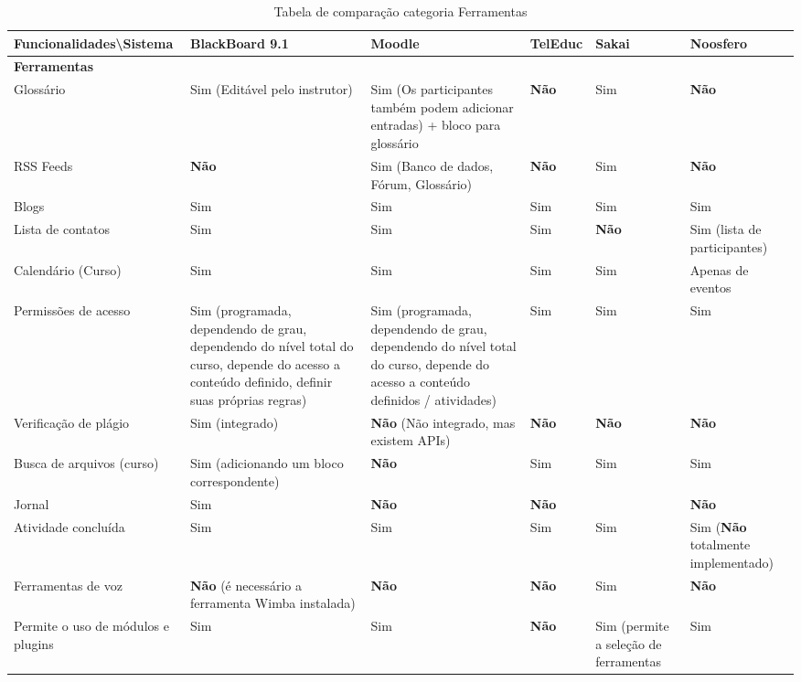 \begin{landscape}
\begin{table}[H]
\begin{tabular}{|@{}p{5.5cm}|p{3.5cm}|p{3.5cm}|p{3.5cm}|p{3.5cm}|p{3.5cm}@{}|}
\hline
\textbf{Funcionalidades\textbackslash Sistema} & \textbf{BlackBoard 9.1} & \textbf{Moodle} & \textbf{TelEduc} & \textbf{Sakai} & \textbf{Noosfero}\\ \hline
\textbf{Ferramentas} &  &  &  &  &  \\
Glossário & Sim {\tiny (Editável pelo instrutor)} & Sim {\tiny (Os participantes também podem adicionar entradas) + bloco para glossário} & \textbf{Não}  & Sim & \textbf{Não} \\
RSS Feeds & \textbf{Não}  & Sim {\tiny (Banco de dados, Fórum, Glossário)} & \textbf{Não}  & Sim & \textbf{Não}  \\
Blogs & Sim & Sim & Sim & Sim & Sim \\
Lista de contatos & Sim & Sim & Sim & \textbf{Não}  & Sim {\tiny (lista de participantes)}\\
Calendário (Curso) & Sim & Sim & Sim & Sim & {\tiny Apenas de eventos} \\
Permissões de acesso & Sim {\tiny (programada, dependendo de grau, dependendo do nível total do curso, depende do acesso a conteúdo definido, definir suas próprias regras)} & Sim \tiny{(programada, dependendo de grau, dependendo do nível total do curso, depende do acesso a conteúdo definidos / atividades)} & Sim & Sim & Sim \\
Verificação de plágio & Sim {\tiny (integrado)} & \textbf{Não}  {\tiny (Não integrado, mas existem APIs)} & \textbf{Não}  & \textbf{Não}  & \textbf{Não}  \\
Busca de arquivos (curso) & Sim {\tiny (adicionando um bloco correspondente)} & \textbf{Não}  & Sim & Sim & Sim \\
Jornal & Sim & \textbf{Não}  & \textbf{Não}  &  & \textbf{Não}  \\
Atividade concluída & Sim & Sim & Sim & Sim & Sim {\tiny (\textbf{Não}  totalmente implementado)} \\
Ferramentas de voz & \textbf{Não}  (é necessário a ferramenta Wimba instalada) & \textbf{Não}  & \textbf{Não}  & Sim & \textbf{Não}  \\
Permite o uso de módulos e plugins & Sim & Sim & \textbf{Não}  & Sim {\tiny (permite a seleção de ferramentas} & Sim \\ \hline
\end{tabular}
\caption{Tabela de comparação categoria Ferramentas}
\label{tab:ferramentas}
\end{table}


\end{landscape}
